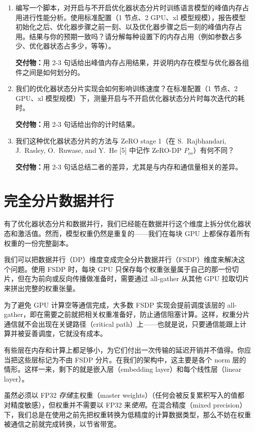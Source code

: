 \begin{enumerate}[label=(\alph*)]
  \item 编写一个脚本，对开启与不开启优化器状态分片时训练语言模型的峰值内存占用进行性能分析。使用标准配置（1 节点、2 GPU、xl 模型规模），报告模型初始化之后、优化器步骤之前一刻、以及优化器步骤之后一刻的峰值内存占用。结果与你的预期一致吗？请分解每种设置下的内存占用（例如参数占多少、优化器状态占多少，等等）。

  \textbf{交付物：}用 2-3 句话给出峰值内存占用结果，并说明内存在模型与优化器各组件之间是如何划分的。

  \item 我们的优化器状态分片实现会如何影响训练速度？在标准配置（1 节点、2 GPU、xl 模型规模）下，测量开启与不开启优化器状态分片时每次迭代的耗时。

  \textbf{交付物：}用 2-3 句话给出你的计时结果。

  \item 我们这种优化器状态分片的方法与 ZeRO stage 1（在 S.~Rajbhandari, J.~Rasley, O.~Ruwase, and Y.~He [5] 中记作 ZeRO-DP $P_{os}$）有何不同？

  \textbf{交付物：}用 2-3 句话总结二者的差异，尤其是与内存和通信量相关的差异。
\end{enumerate}

\section{完全分片数据并行}

有了优化器状态分片和数据并行，我们已经能在数据并行这个维度上拆分优化器状态和激活值。然而，模型权重仍然是重复的——我们在每块 GPU 上都保存着所有权重的一份完整副本。

我们可以把数据并行（DP）维度变成完全分片数据并行（FSDP）维度来解决这个问题。使用 FSDP 时，每块 GPU 只保存每个权重张量属于自己的那一份切片，但在为前向或反向传播做准备时，需要通过 all-gather 从其他 GPU 拉取切片来拼出完整的权重张量。

为了避免 GPU 计算空等通信完成，大多数 FSDP 实现会提前调度该层的 all-gather，即在需要之前就把相关权重准备好，防止通信阻塞计算。这样，权重分片通信就不会出现在关键路径（critical path）上——也就是说，只要通信能跟上计算并被妥善调度，它就没有成本。

有些层在内存和计算上都足够小，为它们付出一次传输的延迟开销并不值得。你应当把这些层标记为不由 FSDP 分片。在我们的架构中，这主要是各个 norm 层的情形。这样一来，剩下的就是嵌入层（embedding layer）和每个线性层（linear layer）。

虽然必须以 FP32 \emph{存储}主权重（master weights）（任何会被反复累积写入的值都对精度敏感），但权重并不需要以 FP32 来\emph{使用}。在混合精度（mixed precision）下，我们总是在使用之前先把权重转换为低精度的计算数据类型，那么不妨在权重被通信之前就完成转换，以节省带宽。

